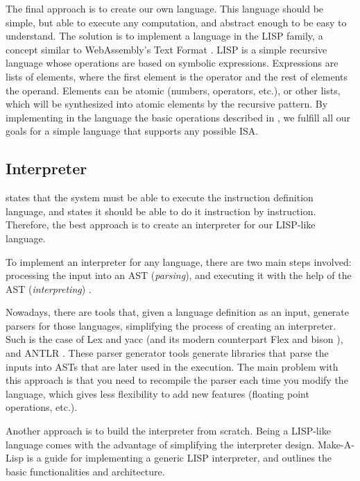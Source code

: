 The final approach is to create our own language. This language should be simple, but able to execute any computation, and abstract enough to be easy to understand. The solution is to implement a language in the LISP family, a concept similar to WebAssembly's Text Format \parencite{wasmtext}. LISP \parencite{mccarthy1960recursive} is a simple recursive language whose operations are based on symbolic expressions. Expressions are lists of elements, where the first element is the operator and the rest of elements the operand. Elements can be atomic (numbers, operators, etc.), or other lists, which will be synthesized into atomic elements by the recursive pattern. By implementing in the language the basic operations described in , we fulfill all our goals for a simple language that supports any possible \gls{ISA}. 


\subsection{Interpreter}\label{subsec:interpreter-study}
 states that the system must be able to execute the \gls{instruction} definition language, and  states it should be able to do it \gls{instruction} by instruction. Therefore, the best approach is to create an \gls{interpreter} for our LISP-like language.

To implement an \gls{interpreter} for any language, there are two main steps involved: processing the input into an \gls{AST} (\textit{parsing}), and executing it with the help of the \gls{AST} (\textit{interpreting}) \parencite{mogensen2009basics}.

Nowadays, there are tools that, given a language definition as an input, generate parsers for those languages, simplifying the process of creating an \gls{interpreter}. Such is the case of Lex and yacc \parencite{LevineJohnR1992Ly} (and its modern counterpart Flex and bison \parencite{LevineJohnR2009Fb}), and ANTLR \parencite{ParrTerenceTerenceJohn2010Lip}%
. These parser generator tools generate libraries that parse the inputs into \glspl{AST} that are later used in the execution. The main problem with this approach is that you need to recompile the parser each time you modify the language, which gives less flexibility to add new features (floating point operations, etc.).

Another approach is to build the \gls{interpreter} from scratch. Being a LISP-like language comes with the advantage of simplifying the \gls{interpreter} design. Make-A-Lisp \parencite{mal} is a guide for implementing a generic LISP \gls{interpreter}, and outlines the basic functionalities and architecture.


